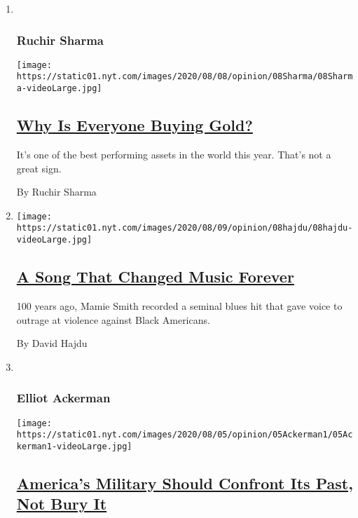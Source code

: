\begin{enumerate}
\def\labelenumi{\arabic{enumi}.}
\item ~
  \hypertarget{ruchir-sharma}{%
  \subsubsection{Ruchir Sharma}\label{ruchir-sharma}}

  \texttt{[image: https://static01.nyt.com/images/2020/08/08/opinion/08Sharma/08Sharma-videoLarge.jpg]}

  \hypertarget{why-is-everyone-buying-gold}{%
  \subsection{\texorpdfstring{\href{/2020/08/08/opinion/gold-investment-coronavirus.html}{Why
  Is Everyone Buying
  Gold?}}{Why Is Everyone Buying Gold?}}\label{why-is-everyone-buying-gold}}

  It's one of the best performing assets in the world this year. That's
  not a great sign.

  By Ruchir Sharma
\item
  \texttt{[image: https://static01.nyt.com/images/2020/08/09/opinion/08hajdu/08hajdu-videoLarge.jpg]}

  \hypertarget{a-song-that-changed-music-forever}{%
  \subsection{\texorpdfstring{\href{/2020/08/08/opinion/sunday/crazy-blues-mamie-smith.html}{A
  Song That Changed Music
  Forever}}{A Song That Changed Music Forever}}\label{a-song-that-changed-music-forever}}

  100 years ago, Mamie Smith recorded a seminal blues hit that gave
  voice to outrage at violence against Black Americans.

  By David Hajdu
\item ~
  \hypertarget{elliot-ackerman}{%
  \subsubsection{Elliot Ackerman}\label{elliot-ackerman}}

  \texttt{[image: https://static01.nyt.com/images/2020/08/05/opinion/05Ackerman1/05Ackerman1-videoLarge.jpg]}

  \hypertarget{americas-military-should-confront-its-past-not-bury-it}{%
  \subsection{\texorpdfstring{\href{/2020/08/08/opinion/nazi-confederate-military-history-ksk.html}{America's
  Military Should Confront Its Past, Not Bury
  It}}{America's Military Should Confront Its Past, Not Bury It}}\label{americas-military-should-confront-its-past-not-bury-it}}


\end{enumerate}
